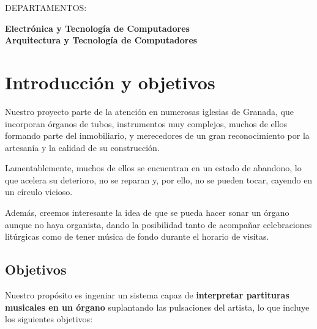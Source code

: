 \documentclass[10pt,a4paper]{article}
\begin{document}
	\begin{center}
		\vspace*{0.5cm}
	\end{center}
	
	\begin{center}
		DEPARTAMENTOS:
	\end{center}
	
	\begin{center}
		\textbf{Electrónica y Tecnología de Computadores} \\
		\textbf{Arquitectura y Tecnología de Computadores}
	\end{center}
	
	
	\newpage
	\tableofcontents
	
	
	\newpage
	\pagestyle{fancy}
	\section{Introducción y objetivos}
	
	Nuestro proyecto parte de la atención en numerosas iglesias de Granada, que
	incorporan órganos de tubos, instrumentos muy complejos, muchos de ellos
	formando parte del inmobiliario, y merecedores de un gran reconocimiento por
	la artesanía y la calidad de su construcción.
	
	Lamentablemente, muchos de ellos se encuentran en un estado de abandono, lo
	que acelera su deterioro, no se reparan y, por ello, no se pueden tocar,
	cayendo en un círculo vicioso.
	
	Además, creemos interesante la idea de que se pueda hacer sonar un órgano
	aunque no haya organista, dando la posibilidad tanto de acompañar
	celebraciones litúrgicas como de tener música de fondo durante el horario de
	visitas.
	
	\subsection{Objetivos}
	
	Nuestro propósito es ingeniar un sistema capaz de \textbf{interpretar
	partituras musicales en un órgano} suplantando las pulsaciones del artista,
	lo que incluye los siguientes objetivos:
	
\end{document}
